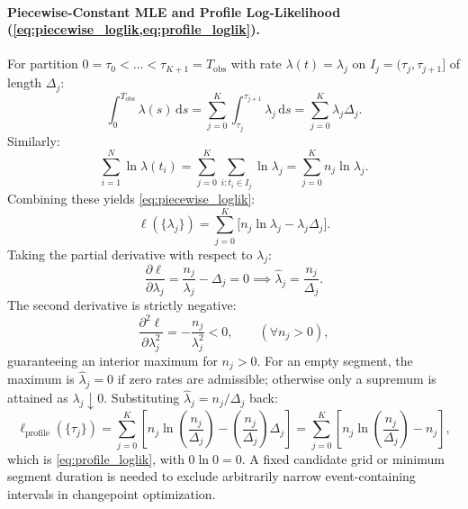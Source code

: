 \paragraph{Piecewise-Constant MLE and Profile Log-Likelihood
(\cref{eq:piecewise_loglik,eq:profile_loglik}).}
For partition $0 = \tau_0 < \dots < \tau_{K+1} = T_{\mathrm{obs}}$ with rate
$\lambda(t) = \lambda_j$ on $I_j = (\tau_j, \tau_{j+1}]$ of length $\Delta_j$:
\begin{equation}
  \int_0^{T_{\mathrm{obs}}} \lambda(s)\,\mathrm{d}s = \sum_{j=0}^K
  \int_{\tau_j}^{\tau_{j+1}} \lambda_j\,\mathrm{d}s = \sum_{j=0}^K
  \lambda_j \Delta_j.
\end{equation}
Similarly:
\begin{equation}
  \sum_{i=1}^N \ln\lambda(t_i) = \sum_{j=0}^K \sum_{i: t_i \in I_j}
  \ln\lambda_j = \sum_{j=0}^K n_j \ln\lambda_j.
\end{equation}
Combining these yields \cref{eq:piecewise_loglik}:
\begin{equation}
  \ell(\{\lambda_j\}) = \sum_{j=0}^K \bigl[ n_j \ln\lambda_j -
  \lambda_j \Delta_j \bigr].
\end{equation}
Taking the partial derivative with respect to $\lambda_j$:
\begin{equation}
  \frac{\partial \ell}{\partial \lambda_j} = \frac{n_j}{\lambda_j} -
  \Delta_j = 0 \implies \hat{\lambda}_j = \frac{n_j}{\Delta_j}.
\end{equation}
The second derivative is strictly negative:
\begin{equation}
  \frac{\partial^2 \ell}{\partial \lambda_j^2} =
  -\frac{n_j}{\lambda_j^2} < 0, \qquad (\forall n_j > 0),
\end{equation}
guaranteeing an interior maximum for $n_j>0$. For an empty segment,
the maximum is $\hat\lambda_j=0$ if zero rates are admissible; otherwise
only a supremum is attained as $\lambda_j\downarrow0$.
Substituting $\hat{\lambda}_j
= n_j/\Delta_j$ back:
\begin{equation}
  \ell_{\mathrm{profile}}(\{\tau_j\}) = \sum_{j=0}^K \left[ n_j
    \ln\left(\frac{n_j}{\Delta_j}\right) -
  \left(\frac{n_j}{\Delta_j}\right)\Delta_j \right]
  = \sum_{j=0}^K \left[ n_j \ln\left(\frac{n_j}{\Delta_j}\right) - n_j \right],
\end{equation}
which is \cref{eq:profile_loglik}, with $0\ln0=0$. A fixed candidate
grid or minimum segment duration is needed to exclude arbitrarily narrow
event-containing intervals in changepoint optimization.

